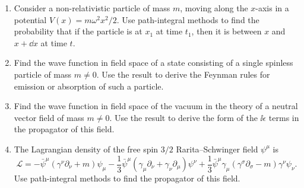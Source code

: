

\begin{enumerate}
\item Consider a non-relativistic particle of mass $m$, moving along the
  $x$-axis in a potential $V(x)=m\omega^2x^2/2$. Use path-integral methods
  to find the probability that if the particle is at $x_1$ at time $t_1$,
  then it is between $x$ and $x+\dd x$ at time $t$.

\item Find the wave function in field space of a state consisting of a single
  spinless particle of mass $m\neq0$. Use the result to derive the Feynman
  rules for emission or absorption of such a particle.

\item Find the wave function in field space of the vacuum in the theory of a
  neutral vector field of mass $m\neq0$. Use the result to derive the form of
  the $\ii\epsilon$ terms in the propagator of this field.

\item The Lagrangian density of the free spin $3/2$ Rarita--Schwinger field
  $\psi^\mu$ is
  \[
    \mathcal{L}=-\bar\psi^\mu(\gamma^\nu\partial_\nu+m)\psi_\mu
    -\frac{1}{3}\bar\psi^\mu(\gamma_\mu\partial_\nu
      +\gamma_\nu\partial_\mu)\psi^\nu
    +\frac{1}{3}\bar\psi^\mu\gamma_\mu
      (\gamma^\sigma\partial_\sigma-m)\gamma^\nu\psi_\nu.
  \]
  Use path-integral methods to find the propagator of this field.
\end{enumerate}


